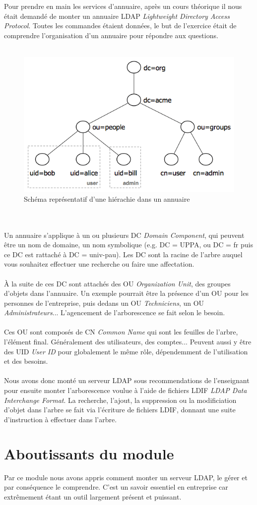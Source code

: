 Pour prendre en main les services d'annuaire, après un cours théorique il nous était demandé de monter un annuaire LDAP \textit{Lightweight Directory Access Protocol}. Toutes les commandes étaient données, le but de l'exercice était de comprendre l'organisation d'un annuaire pour répondre aux questions.
\\ \\
\begin{figure}[h]
    \centering
    \includegraphics[width=1\linewidth]{imgs/acme_ldap.png}
    \caption{Schéma représentatif d'une hiérachie dans un annuaire}
    \label{fig:canal}
\end{figure}\\ \\
Un annuaire s'applique à un ou plusieurs DC \textit{Domain Component}, qui peuvent être un nom de domaine, un nom symbolique (e.g. DC = UPPA, ou DC = fr puis ce DC est rattaché à DC = univ-pau). Les DC sont la racine de l'arbre auquel vous souhaitez effectuer une recherche ou faire une affectation. 
\\ \\
À la suite de ces DC sont attachés des OU \textit{Organization Unit}, des groupes d'objets dans l'annuaire. Un exemple pourrait être la présence d'un OU pour les personnes de l'entreprise, puis dedans un OU \textit{Techniciens}, un OU \textit{Administrateurs}... L'agencement de l'arborescence se fait selon le besoin.
\\ \\
Ces OU sont composés de CN \textit{Common Name} qui sont les feuilles de l'arbre, l'élément final. Généralement des utilisateurs, des comptes... Peuvent aussi y être des UID \textit{User ID} pour globalement le même rôle, dépendemment de l'utilisation et des besoins.
\\ \\
Nous avons donc monté un serveur LDAP sous recommendations de l'enseignant pour ensuite monter l'arborescence voulue à l'aide de fichiers LDIF \textit{LDAP Data Interchange Format}. La recherche, l'ajout, la suppression ou la modificiation d'objet dans l'arbre se fait via l'écriture de fichiers LDIF, donnant une suite d'instruction à effectuer dans l'arbre.

\section{Aboutissants du module}

Par ce module nous avons appris comment monter un serveur LDAP, le gérer et par conséquence le comprendre. C'est un savoir essentiel en entreprise car extrêmement étant un outil largement présent et puissant.